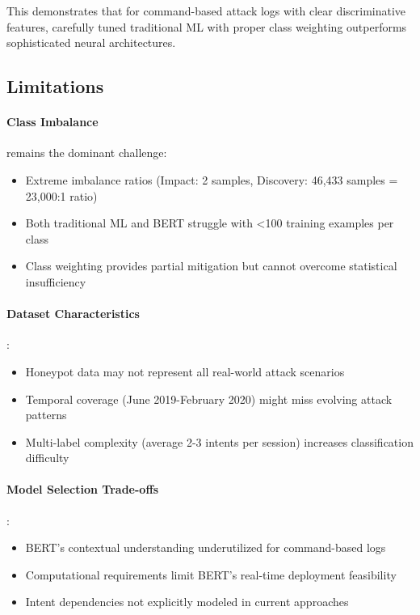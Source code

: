 \documentclass[acmlarge,screen,nonacm]{acmart}
\begin{document}
This demonstrates that for command-based attack logs with clear discriminative features, carefully tuned traditional ML with proper class weighting outperforms sophisticated neural architectures.

\subsection{Limitations}

\paragraph{Class Imbalance} remains the dominant challenge:
\begin{itemize}
    \item Extreme imbalance ratios (Impact: 2 samples, Discovery: 46,433 samples = 23,000:1 ratio)
    \item Both traditional ML and BERT struggle with <100 training examples per class
    \item Class weighting provides partial mitigation but cannot overcome statistical insufficiency
\end{itemize}

\paragraph{Dataset Characteristics}:
\begin{itemize}
    \item Honeypot data may not represent all real-world attack scenarios
    \item Temporal coverage (June 2019-February 2020) might miss evolving attack patterns
    \item Multi-label complexity (average 2-3 intents per session) increases classification difficulty
\end{itemize}

\paragraph{Model Selection Trade-offs}:
\begin{itemize}
    \item BERT's contextual understanding underutilized for command-based logs
    \item Computational requirements limit BERT's real-time deployment feasibility
    \item Intent dependencies not explicitly modeled in current approaches
\end{itemize}
\end{document}
